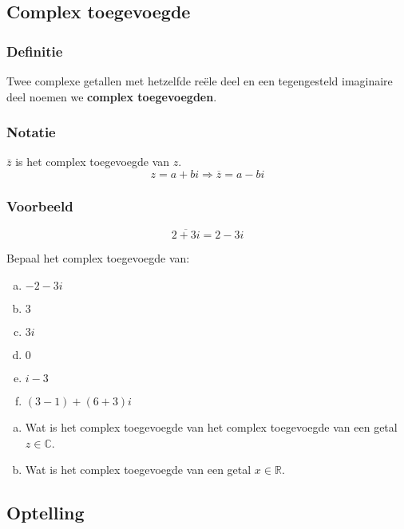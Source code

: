 \documentclass[12pt,twoside,a4]{article}
\begin{document}
\subsection{Complex toegevoegde}

\subsubsection*{Definitie}
\begin{mdframed}
Twee complexe getallen met hetzelfde reële deel en een tegengesteld imaginaire deel noemen we {\bf complex toegevoegden}.
\end{mdframed}

\subsubsection*{Notatie}
$\bar{z}$ is het complex toegevoegde van $z$.
\[z=a+bi \Rightarrow \overline{z}=a-bi\]

\subsubsection*{Voorbeeld}
$$\overline{2+3i}=2-3i$$

\begin{oefening}
Bepaal het complex toegevoegde van:
\begin{multicols}{2}
\begin{enumerate}[(a)]
  \item $-2-3i$
  \item $3$
  \item $3i$
  \item $0$
  \item $i-3$
  \item $(3-1)+(6+3)i$
\end{enumerate}
\end{multicols}
\end{oefening}

\begin{oefening}
\begin{enumerate}[(a)]
  \item Wat is het complex toegevoegde van het complex toegevoegde van een getal $z\in\mathbb{C}$.
  \item Wat is het complex toegevoegde van een getal $x\in\mathbb{R}$.
\end{enumerate}

\end{oefening}

\subsection{Optelling}
\end{document}
